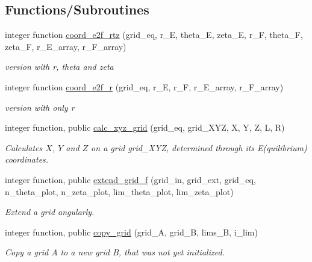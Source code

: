 \subsection*{Functions/\+Subroutines}
\begin{DoxyCompactItemize}
\item 
integer function \hyperlink{namespacegrid__utilities_a2a3c0509679b438d9d5aa5bedfb7a7b8}{coord\+\_\+e2f\+\_\+rtz} (grid\+\_\+eq, r\+\_\+E, theta\+\_\+E, zeta\+\_\+E, r\+\_\+F, theta\+\_\+F, zeta\+\_\+F, r\+\_\+\+E\+\_\+array, r\+\_\+\+F\+\_\+array)
\begin{DoxyCompactList}\small\item\em version with r, theta and zeta \end{DoxyCompactList}\item 
integer function \hyperlink{namespacegrid__utilities_a7866b2c198255dec7904dac73ccf4340}{coord\+\_\+e2f\+\_\+r} (grid\+\_\+eq, r\+\_\+E, r\+\_\+F, r\+\_\+\+E\+\_\+array, r\+\_\+\+F\+\_\+array)
\begin{DoxyCompactList}\small\item\em version with only r \end{DoxyCompactList}\item 
integer function, public \hyperlink{namespacegrid__utilities_a39e7cd9b8f173994358dbdd6b57827e1}{calc\+\_\+xyz\+\_\+grid} (grid\+\_\+eq, grid\+\_\+\+X\+YZ, X, Y, Z, L, R)
\begin{DoxyCompactList}\small\item\em Calculates $X$, $Y$ and $Z$ on a grid {\ttfamily grid\+\_\+\+X\+YZ}, determined through its E(quilibrium) coordinates. \end{DoxyCompactList}\item 
integer function, public \hyperlink{namespacegrid__utilities_a414a1a11924bc935afca3a89fc31f2f5}{extend\+\_\+grid\+\_\+f} (grid\+\_\+in, grid\+\_\+ext, grid\+\_\+eq, n\+\_\+theta\+\_\+plot, n\+\_\+zeta\+\_\+plot, lim\+\_\+theta\+\_\+plot, lim\+\_\+zeta\+\_\+plot)
\begin{DoxyCompactList}\small\item\em Extend a grid angularly. \end{DoxyCompactList}\item 
integer function, public \hyperlink{namespacegrid__utilities_a04f971c38083f873a04eb6568bed466b}{copy\+\_\+grid} (grid\+\_\+A, grid\+\_\+B, lims\+\_\+B, i\+\_\+lim)
\begin{DoxyCompactList}\small\item\em Copy a grid A to a new grid B, that was not yet initialized. \end{DoxyCompactList}\item 

\end{DoxyCompactItemize}
